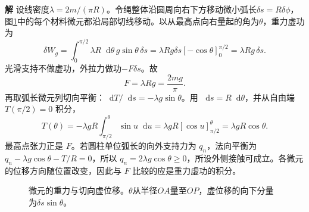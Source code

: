 \documentclass[11pt,openany,fontset=fandol]{ctexbook}
\theoremstyle{definition}\newtheorem{example}{例}[chapter]\newtheorem{exercise}{习题}[chapter]
\newcommand{\SolutionStart}{\par\medskip\ifdim\pagetotal>0pt\ifdim\dimexpr\pagegoal-\pagetotal\relax<3\baselineskip\newpage\fi\fi\noindent\textbf{解}\quad\ignorespaces}
\newenvironment{solution}{\SolutionStart}{\par\medskip}
\newcommand{\dd}{\mathop{}\!\mathrm d}\newcommand{\ee}{\mathrm e}\newcommand{\vct}[1]{\bm{#1}}
\begin{document}
\begin{solution}
设线密度$\lambda=2m/(\pi R)$。令绳整体沿圆周向右下方移动微小弧长$\delta s=R\delta\phi$，图\ref{mp5:fig:hw:l5-32a-s}中的每个材料微元都沿局部切线移动。以从最高点向右量起的角为$\theta$，重力虚功为
\[
 \delta W_g=\int_0^{\pi/2}\lambda R\dd\theta\,g\sin\theta\,\delta s
            =\lambda Rg\delta s[-\cos\theta]_0^{\pi/2}
            =\lambda Rg\,\delta s.
\]
光滑支持不做虚功，外拉力做功$-F\delta s$。故
\[
 \boxed{F=\lambda Rg=\frac{2mg}{\pi}}.
\]
再取弧长微元列切向平衡：$\dd T/\dd s=-\lambda g\sin\theta$。用 $\dd s=R\dd\theta$，并从自由端 $T(\pi/2)=0$ 积分，
\[
 T(\theta)=-\lambda gR\int_{\pi/2}^\theta\sin u\dd u
 =\lambda gR[\cos u]_{\pi/2}^\theta=\lambda gR\cos\theta.
\]
最高点张力正是 $F$。若圆柱单位弧长的向外支持力为 $q_n$，法向平衡为 $q_n-\lambda g\cos\theta-T/R=0$，所以 $q_n=2\lambda g\cos\theta\ge0$，所设外侧接触可成立。各微元的位移方向随位置改变，因此与 $F$ 比较的应是重力虚功的积分。


\begin{figure}[H]\centering
{}
\caption{微元的重力与切向虚位移。$\theta$从半径$OA$量至$OP$，虚位移的向下分量为$\delta s\sin\theta$。}\label{mp5:fig:hw:l5-32a-s}
\end{figure}

\end{solution}
\end{document}
